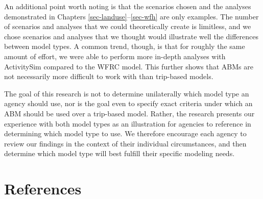\documentclass[fancy, oneside, mastersfancy, ms]{byuthesis}
\begin{document}
An additional point worth noting is that the scenarios chosen and the
analyses demonstrated in Chapters \ref{sec-landuse}--\ref{sec-wfh} are
only examples. The number of scenarios and analyses that we could
theoretically create is limitless, and we chose scenarios and analyses
that we thought would illustrate well the differences between model
types. A common trend, though, is that for roughly the same amount of
effort, we were able to perform more in-depth analyses with ActivitySim
compared to the WFRC model. This further shows that ABMs are not
necessarily more difficult to work with than trip-based models.

The goal of this research is not to determine unilaterally which model
type an agency should use, nor is the goal even to specify exact
criteria under which an ABM should be used over a trip-based model.
Rather, the research presents our experience with both model types as an
illustration for agencies to reference in determining which model type
to use. We therefore encourage each agency to review our findings in the
context of their individual circumstances, and then determine which
model type will best fulfill their specific modeling needs.


\chapter*{References}\label{references}

\end{document}
